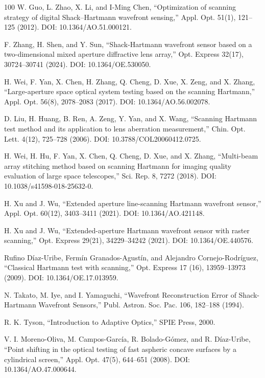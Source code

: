\documentclass[letterpaper,12pt,oneside]{book}
\begin{document}
\begin{thebibliography}{100}
	W. Guo, L. Zhao, X. Li, and I-Ming Chen, ``Optimization of scanning strategy of digital Shack--Hartmann wavefront sensing,'' Appl. Opt. 51(1), 121--125 (2012). DOI: 10.1364/AO.51.000121.
	
	F. Zhang, H. Shen, and Y. Sun, ``Shack-Hartmann wavefront sensor based on a two-dimensional mixed aperture diffractive lens array,'' Opt. Express 32(17), 30724--30741 (2024). DOI: 10.1364/OE.530050.
	
	H. Wei, F. Yan, X. Chen, H. Zhang, Q. Cheng, D. Xue, X. Zeng, and X. Zhang, ``Large-aperture space optical system testing based on the scanning Hartmann,'' Appl. Opt. 56(8), 2078--2083 (2017). DOI: 10.1364/AO.56.002078.
	
	D. Liu, H. Huang, B. Ren, A. Zeng, Y. Yan, and X. Wang, ``Scanning Hartmann test method and its application to lens aberration measurement,'' Chin. Opt. Lett. 4(12), 725--728 (2006). DOI: 10.3788/COL20060412.0725.
	
	H. Wei, H. Hu, F. Yan, X. Chen, Q. Cheng, D. Xue, and X. Zhang, ``Multi-beam array stitching method based on scanning Hartmann for imaging quality evaluation of large space telescopes,'' Sci. Rep. 8, 7272 (2018). DOI: 10.1038/s41598-018-25632-0.
	
	H. Xu and J. Wu, ``Extended aperture line-scanning Hartmann wavefront sensor,'' Appl. Opt. 60(12), 3403--3411 (2021). DOI: 10.1364/AO.421148.

	H. Xu and J. Wu, ``Extended-aperture Hartmann wavefront sensor with raster scanning,'' Opt. Express 29(21), 34229--34242 (2021). DOI: 10.1364/OE.440576.
	
	Rufino Díaz-Uribe, Fermín Granados-Agustín, and Alejandro Cornejo-Rodríguez, ``Classical Hartmann test with scanning,'' Opt. Express 17 (16), 13959--13973 (2009). DOI: 10.1364/OE.17.013959.
	
	N. Takato, M. Iye, and I. Yamaguchi, ``Wavefront Reconstruction Error of Shack-Hartmann Wavefront Sensors,'' Publ. Astron. Soc. Pac. 106, 182--188 (1994).
	
	R. K. Tyson, ``Introduction to Adaptive Optics,'' SPIE Press, 2000.
	
	V. I. Moreno-Oliva, M. Campos-García, R. Bolado-Gómez, and R. Díaz-Uribe, ``Point shifting in the optical testing of fast aspheric concave surfaces by a cylindrical screen,'' Appl. Opt. 47(5), 644--651 (2008). DOI: 10.1364/AO.47.000644.


\end{thebibliography}
\end{document}
